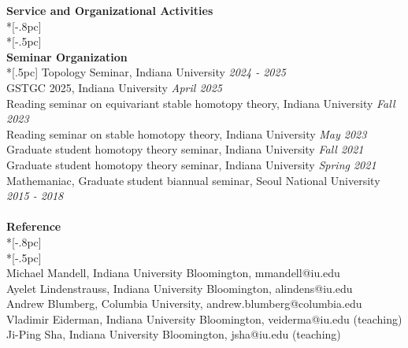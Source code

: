 \documentclass{article}
\begin{document}
{\Large \bf Service and Organizational Activities} \\*[-.8pc]
\underline{\hspace{6.5in}} \\*[-.5pc]
\\
{\bf \large Seminar Organization} \\*[.5pc]
{Topology Seminar, Indiana University} \hfill {\it 2024 - 2025\/} \\
{GSTGC 2025, Indiana University} \hfill {\it April 2025\/} \\
{Reading seminar on equivariant stable homotopy theory, Indiana University} \hfill {\it Fall 2023 \/} \\
{Reading seminar on stable homotopy theory, Indiana University} \hfill {\it May 2023 \/} \\
{Graduate student homotopy theory seminar, Indiana University} \hfill {\it Fall 2021\/} \\
{Graduate student homotopy theory seminar, Indiana University} \hfill {\it Spring 2021\/} \\
{Mathemaniac, Graduate student biannual seminar, Seoul National University}  \hfill {\it 2015 - 2018\/} \\
\\
{\Large \bf Reference} \\*[-.8pc]
\underline{\hspace{6.5in}} \\*[-.5pc]
\\
{Michael Mandell, Indiana University Bloomington, mmandell@iu.edu}  \\
{Ayelet Lindenstrauss, Indiana University Bloomington, alindens@iu.edu} \\
{Andrew Blumberg, Columbia University, andrew.blumberg@columbia.edu}  \\
{Vladimir Eiderman, Indiana University Bloomington, veiderma@iu.edu} \hfill {(teaching)} \\
{Ji-Ping Sha, Indiana University Bloomington, jsha@iu.edu} \hfill {(teaching)} \\
\end{document}
